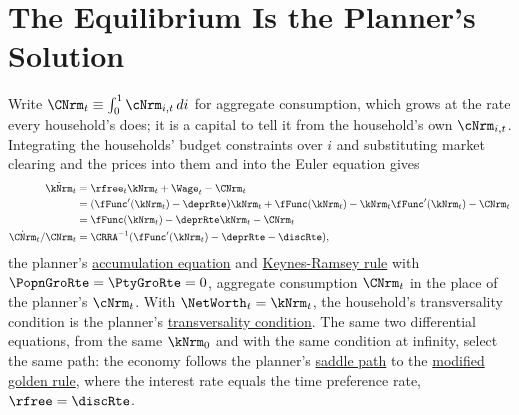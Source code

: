 \documentclass{econark}
\begin{document}
\section{The Equilibrium Is the Planner's Solution}

Write $\CNrm_{t} \equiv \int_{0}^{1}\cNrm_{i,t}\,di$ for aggregate consumption, which grows at the rate every household's does; it is a capital to tell it from the household's own $\cNrm_{i,t}$. Integrating the households' budget constraints over $i$ and substituting market clearing and the prices into them and into the Euler equation gives
\begin{equation}\begin{gathered}\begin{aligned}
  \dot{\kNrm}_{t} & =  \rfree_{t}\kNrm_{t} + \Wage_{t} - \CNrm_{t}
\\ & = (\fFunc^{\prime}(\kNrm_{t})-\deprRte)\kNrm_{t} + \fFunc(\kNrm_{t}) - \kNrm_{t}\fFunc^{\prime}(\kNrm_{t}) - \CNrm_{t}
\\ & = \fFunc(\kNrm_{t}) - \deprRte\kNrm_{t} - \CNrm_{t}
\\ \dot{\CNrm}_{t}/\CNrm_{t} & = \CRRA^{-1}(\fFunc^{\prime}(\kNrm_{t})-\deprRte-\discRte),
\end{aligned}\end{gathered}\label{eq:DecRCK-aggkdot}\end{equation}
the planner's \href{https://intertemporal-choice.github.io/content/growth/ramseycasskoopmans/\#eq-rck-kdot}{accumulation equation} and \href{https://intertemporal-choice.github.io/content/growth/ramseycasskoopmans/\#eq-cdotoc}{Keynes-Ramsey rule} with $\PopnGroRte=\PtyGroRte=0$, aggregate consumption $\CNrm_{t}$ in the place of the planner's $\cNrm_{t}$. With $\NetWorth_{t}=\kNrm_{t}$, the household's transversality condition is the planner's \href{https://intertemporal-choice.github.io/content/growth/ramseycasskoopmans/\#eq-tvc}{transversality condition}. The same two differential equations, from the same $\kNrm_{0}$ and with the same condition at infinity, select the same path: the economy follows the planner's \href{https://intertemporal-choice.github.io/content/growth/ramseycasskoopmans/\#fig-ramseysaddleplot}{saddle path} to the \href{https://intertemporal-choice.github.io/content/growth/ramseycasskoopmans/\#eq-rck-modgoldenrule}{modified golden rule}, where the interest rate equals the time preference rate, $\rfree = \discRte$.
\end{document}
